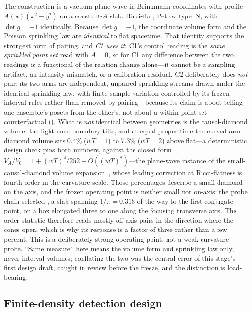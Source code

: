 The construction is a vacuum plane wave in Brinkmann coordinates with profile
$A(u)(x^2 - y^2)$ on a constant-$A$ slab: Ricci-flat, Petrov type~N, with
$\det g = -1$ identically. Because $\det g = -1$, the coordinate volume form
and the Poisson sprinkling law are \emph{identical} to flat spacetime. That
identity supports the strongest form of pairing, and \emph{C1 uses it}: C1's
control reading is the \emph{same sprinkled point set} read with $A = 0$, so
for C1 any difference between the two readings is a functional of the
relation change alone---it cannot be a sampling artifact, an intensity
mismatch, or a calibration residual. C2 deliberately does \emph{not} pair:
its two arms are independent, unpaired sprinkling streams drawn under the
identical sprinkling law, with finite-sample variation controlled by its
frozen interval rules rather than removed by pairing---because its claim is
about telling one ensemble's posets from the other's, not about a
within-point-set counterfactual (). What is \emph{not}
identical between geometries is the causal-diamond volume: the light-cone
boundary tilts, and at equal proper time the curved-arm diamond volume sits
0.4\% ($wT = 1$) to 7.3\% ($wT = 2$) above flat---a deterministic design
check pins both numbers, against the closed form
$V_A/V_0 = 1 + (wT)^4/252 + O((wT)^8)$---the plane-wave instance of the
small-causal-diamond volume
expansion~\cite{gibbonssolodukhin2007,wang2019diamond}, whose leading
correction at Ricci-flatness is fourth order in the curvature scale. Those percentages describe a small
diamond on the axis, and the frozen operating point is neither small nor
on-axis: the probe chain selected , a slab spanning
$1/\pi = 0.318$ of the way to the first conjugate point, on a box elongated
three to one along the focusing transverse axis. The order statistic
therefore reads mostly off-axis pairs in the direction where the cones open,
which is why its response is a factor of three rather than a few percent.
This is a deliberately strong operating point, not a weak-curvature probe.
``Same measure'' here means the volume form and
sprinkling law only, never interval volumes; conflating the two was the
central error of this stage's first design draft, caught in review before
the freeze, and the distinction is load-bearing.

\subsection{Finite-density detection design}
\label{sec:design}

